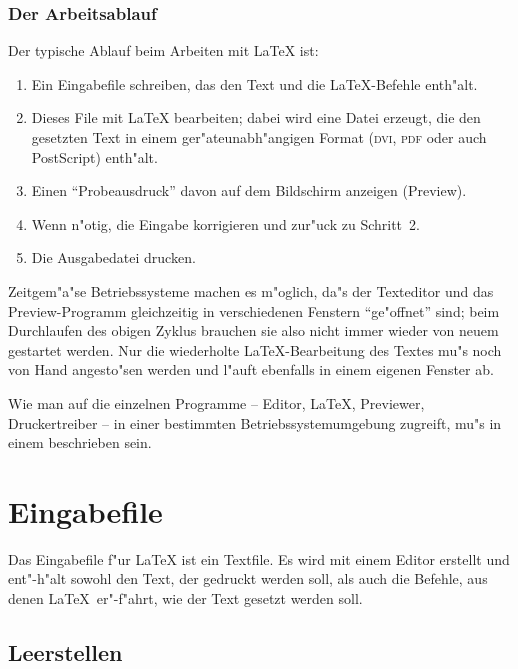 \subsubsection{Der Arbeitsablauf}
Der typische Ablauf beim Arbeiten mit \LaTeX{} ist:
\begin{enumerate}
  \item Ein Eingabefile schreiben, das den Text und die \LaTeX-Befehle 
  enth"alt.
  \item Dieses File mit \LaTeX{} bearbeiten; dabei wird eine Datei
  erzeugt, die den gesetzten Text in einem ger"ateunabh"angigen Format
  (\textsc{dvi}, \textsc{pdf} oder auch PostScript) enth"alt.
  \item Einen "`Probeausdruck"' davon auf dem Bildschirm anzeigen (Preview).
  \item Wenn n"otig, die Eingabe korrigieren und zur"uck zu Schritt~2.
  \item Die Ausgabedatei drucken.
\end{enumerate}
Zeitgem"a"se Betriebssysteme machen es m"oglich, da"s der Texteditor
und das Preview-Programm gleichzeitig in verschiedenen Fenstern 
"`ge"offnet"' sind; beim Durchlaufen des obigen Zyklus brauchen sie 
also nicht immer wieder von neuem gestartet werden.  Nur die 
wiederholte \LaTeX-Bearbeitung des Textes mu"s noch von Hand 
angesto"sen werden und l"auft ebenfalls in einem eigenen Fenster ab.

Wie man auf die einzelnen Programme -- Editor, \LaTeX, Previewer,
Druckertreiber -- in einer bestimmten
Betriebs\-system\-umgebung zugreift, mu"s in einem \local{}
beschrieben sein.



\section{Eingabefile}
Das Eingabefile f"ur \LaTeX{} ist ein Textfile. Es wird mit einem
Editor erstellt und ent"-h"alt sowohl den Text, der gedruckt
werden soll, als auch die Befehle, aus denen \LaTeX\ er"-f"ahrt,
wie der Text gesetzt werden soll.


\subsection{Leerstellen}
 
